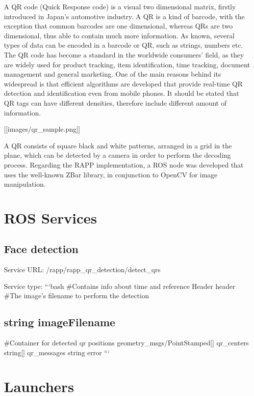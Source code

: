 A Q\-R code (Quick Response code) is a visual two dimensional matrix, firstly introduced in Japan’s automotive industry. A Q\-R is a kind of barcode, with the exception that common barcodes are one dimensional, whereas Q\-Rs are two dimensional, thus able to contain much more information. As known, several types of data can be encoded in a barcode or Q\-R, such as strings, numbers etc. The Q\-R code has become a standard in the worldwide consumers’ field, as they are widely used for product tracking, item identification, time tracking, document management and general marketing. One of the main reasons behind its widespread is that efficient algorithms are developed that provide real-\/time Q\-R detection and identification even from mobile phones. It should be stated that Q\-R tags can have different densities, therefore include different amount of information.

\mbox{[}\mbox{[}images/qr\-\_\-sample.\-png\mbox{]}\mbox{]}

A Q\-R consists of square black and white patterns, arranged in a grid in the plane, which can be detected by a camera in order to perform the decoding process. Regarding the R\-A\-P\-P implementation, a R\-O\-S node was developed that uses the well-\/known Z\-Bar library, in conjunction to Open\-C\-V for image manipulation.

\section*{R\-O\-S Services}

\subsection*{Face detection}

Service U\-R\-L\-: {\ttfamily /rapp/rapp\-\_\-qr\-\_\-detection/detect\-\_\-qrs}

Service type\-: ```bash \#\-Contains info about time and reference Header header \#\-The image's filename to perform the detection \subsection*{string image\-Filename }

\#\-Container for detected qr positions geometry\-\_\-msgs/\-Point\-Stamped\mbox{[}\mbox{]} qr\-\_\-centers string\mbox{[}\mbox{]} qr\-\_\-messages string error ```

\section*{Launchers}


